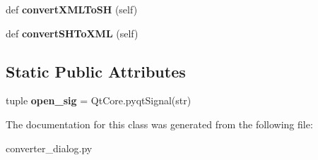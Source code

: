 \begin{DoxyCompactItemize}
\item 
\hypertarget{class_sim_g_d_c_1_1converter__dialog_1_1_converter_dialog_a884838f4da1c8411c4464da50512827b}{}def {\bfseries convert\+X\+M\+L\+To\+S\+H} (self)\label{class_sim_g_d_c_1_1converter__dialog_1_1_converter_dialog_a884838f4da1c8411c4464da50512827b}

\item 
\hypertarget{class_sim_g_d_c_1_1converter__dialog_1_1_converter_dialog_ad956e1d566a415ecf2f37aa11257df10}{}def {\bfseries convert\+S\+H\+To\+X\+M\+L} (self)\label{class_sim_g_d_c_1_1converter__dialog_1_1_converter_dialog_ad956e1d566a415ecf2f37aa11257df10}

\end{DoxyCompactItemize}
\subsection*{Static Public Attributes}
\begin{DoxyCompactItemize}
\item 
\hypertarget{class_sim_g_d_c_1_1converter__dialog_1_1_converter_dialog_af65905920c6fa8afb9e489ac7a04e383}{}tuple {\bfseries open\+\_\+sig} = Qt\+Core.\+pyqt\+Signal(str)\label{class_sim_g_d_c_1_1converter__dialog_1_1_converter_dialog_af65905920c6fa8afb9e489ac7a04e383}

\end{DoxyCompactItemize}


The documentation for this class was generated from the following file\+:\begin{DoxyCompactItemize}
\item 
converter\+\_\+dialog.\+py\end{DoxyCompactItemize}
